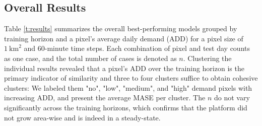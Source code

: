 \subsection{Overall Results}
\label{overall_results}

Table \ref{t:results} summarizes the overall best-performing models grouped by
    training horizon and a pixel's average daily demand (ADD) for a
    pixel size of $1~\text{km}^2$ and 60-minute time steps.
Each combination of pixel and test day counts as one case, and the total
    number of cases is denoted as $n$.
Clustering the individual results revealed that a pixel's ADD over the
    training horizon is the primary indicator of similarity and three to four
    clusters suffice to obtain cohesive clusters:
We labeled them "no", "low", "medium", and "high" demand pixels with
    increasing ADD, and present the average MASE per cluster.
The $n$ do not vary significantly across the training horizons, which confirms
    that the platform did not grow area-wise and is indeed in a steady-state.


